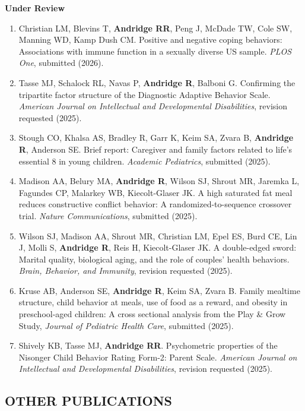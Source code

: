 \documentclass[
  english,
  letterpaper,
  DIV=11,
  numbers=noendperiod]{scrartcl}
\providecommand{\tightlist}{%
  \setlength{\itemsep}{0pt}\setlength{\parskip}{0pt}}
\begin{document}
\textbf{Under Review}

\begin{enumerate}
\def\labelenumi{\arabic{enumi}.}
\tightlist
\item
  Christian LM, Blevins T, \textbf{Andridge RR}, Peng J, McDade TW, Cole
  SW, Manning WD, Kamp Dush CM. Positive and negative coping behaviors:
  Associations with immune function in a sexually diverse US sample.
  \emph{PLOS One}, submitted (2026).
\item
  Tasse MJ, Schalock RL, Navas P, \textbf{Andridge R}, Balboni G.
  Confirming the tripartite factor structure of the Diagnostic Adaptive
  Behavior Scale. \emph{American Journal on Intellectual and
  Developmental Disabilities}, revision requested (2025).
\item
  Stough CO, Khalsa AS, Bradley R, Garr K, Keim SA, Zvara B,
  \textbf{Andridge R}, Anderson SE. Brief report: Caregiver and family
  factors related to life's essential 8 in young children.
  \emph{Academic Pediatrics}, submitted (2025).
\item
  Madison AA, Belury MA, \textbf{Andridge R}, Wilson SJ, Shrout MR,
  Jaremka L, Fagundes CP, Malarkey WB, Kiecolt-Glaser JK. A high
  saturated fat meal reduces constructive conflict behavior: A
  randomized-to-sequence crossover trial. \emph{Nature Communications},
  submitted (2025).
\item
  Wilson SJ, Madison AA, Shrout MR, Christian LM, Epel ES, Burd CE, Lin
  J, Molli S, \textbf{Andridge R}, Reis H, Kiecolt-Glaser JK. A
  double-edged sword: Marital quality, biological aging, and the role of
  couples' health behaviors. \emph{Brain, Behavior, and Immunity},
  revision requested (2025).
\item
  Kruse AB, Anderson SE, \textbf{Andridge R}, Keim SA, Zvara B. Family
  mealtime structure, child behavior at meals, use of food as a reward,
  and obesity in preschool-aged children: A cross sectional analysis
  from the Play \& Grow Study, \emph{Journal of Pediatric Health Care},
  submitted (2025).
\item
  Shively KB, Tasse MJ, \textbf{Andridge RR}. Psychometric properties of
  the Nisonger Child Behavior Rating Form-2: Parent Scale.
  \emph{American Journal on Intellectual and Developmental
  Disabilities}, revision requested (2025).
\end{enumerate}

\subsection{OTHER PUBLICATIONS}\label{other-publications}
\end{document}
